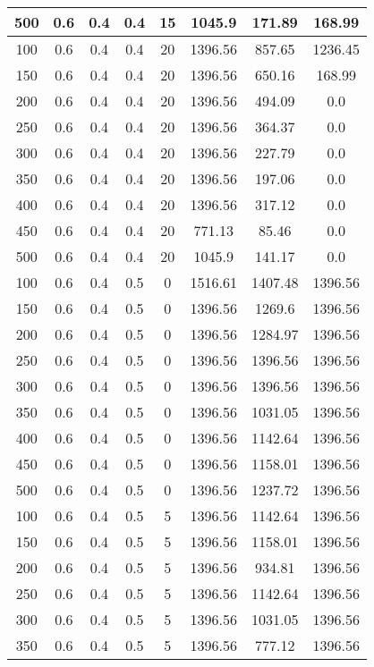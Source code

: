 \documentclass[a4paper, 12pt]{extreport}
\begin{document}
\begin{itemize}
\begin{longtable}{|c|c|c|c|c|c|c|c|}
			500 & 0.6 & 0.4 & 0.4 & 15 & 1045.9 & 171.89 & 168.99 \\\hline
			100 & 0.6 & 0.4 & 0.4 & 20 & 1396.56 & 857.65 & 1236.45 \\\hline
			150 & 0.6 & 0.4 & 0.4 & 20 & 1396.56 & 650.16 & 168.99 \\\hline
			200 & 0.6 & 0.4 & 0.4 & 20 & 1396.56 & 494.09 & 0.0 \\\hline
			250 & 0.6 & 0.4 & 0.4 & 20 & 1396.56 & 364.37 & 0.0 \\\hline
			300 & 0.6 & 0.4 & 0.4 & 20 & 1396.56 & 227.79 & 0.0 \\\hline
			350 & 0.6 & 0.4 & 0.4 & 20 & 1396.56 & 197.06 & 0.0 \\\hline
			400 & 0.6 & 0.4 & 0.4 & 20 & 1396.56 & 317.12 & 0.0 \\\hline
			450 & 0.6 & 0.4 & 0.4 & 20 & 771.13 & 85.46 & 0.0 \\\hline
			500 & 0.6 & 0.4 & 0.4 & 20 & 1045.9 & 141.17 & 0.0 \\\hline
			100 & 0.6 & 0.4 & 0.5 & 0 & 1516.61 & 1407.48 & 1396.56 \\\hline
			150 & 0.6 & 0.4 & 0.5 & 0 & 1396.56 & 1269.6 & 1396.56 \\\hline
			200 & 0.6 & 0.4 & 0.5 & 0 & 1396.56 & 1284.97 & 1396.56 \\\hline
			250 & 0.6 & 0.4 & 0.5 & 0 & 1396.56 & 1396.56 & 1396.56 \\\hline
			300 & 0.6 & 0.4 & 0.5 & 0 & 1396.56 & 1396.56 & 1396.56 \\\hline
			350 & 0.6 & 0.4 & 0.5 & 0 & 1396.56 & 1031.05 & 1396.56 \\\hline
			400 & 0.6 & 0.4 & 0.5 & 0 & 1396.56 & 1142.64 & 1396.56 \\\hline
			450 & 0.6 & 0.4 & 0.5 & 0 & 1396.56 & 1158.01 & 1396.56 \\\hline
			500 & 0.6 & 0.4 & 0.5 & 0 & 1396.56 & 1237.72 & 1396.56 \\\hline
			100 & 0.6 & 0.4 & 0.5 & 5 & 1396.56 & 1142.64 & 1396.56 \\\hline
			150 & 0.6 & 0.4 & 0.5 & 5 & 1396.56 & 1158.01 & 1396.56 \\\hline
			200 & 0.6 & 0.4 & 0.5 & 5 & 1396.56 & 934.81 & 1396.56 \\\hline
			250 & 0.6 & 0.4 & 0.5 & 5 & 1396.56 & 1142.64 & 1396.56 \\\hline
			300 & 0.6 & 0.4 & 0.5 & 5 & 1396.56 & 1031.05 & 1396.56 \\\hline
			350 & 0.6 & 0.4 & 0.5 & 5 & 1396.56 & 777.12 & 1396.56 \\\hline

\end{longtable}
\end{itemize}
\end{document}
